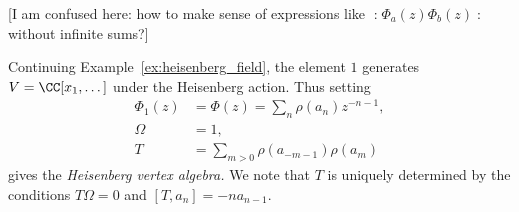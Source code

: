 \documentclass{ck-article}
\newcommand{\normord}[1]{\mathopen{:}#1\mathclose{:}}
\begin{document}
[I am confused here: how to make sense of expressions like $\normord{\Phi_a(z)\Phi_b(z)}$ without infinite sums?]

\begin{Example}
    Continuing Example~\ref{ex:heisenberg_field}, the element $1$ generates $V = \CC[x_1,\dots]$ under the Heisenberg action.
    Thus setting 
    \begin{align*}
        \Phi_1(z) & = \Phi(z) = \sum_n \rho(a_n) z^{-n-1}, \\
        \Omega &= 1, \\
        T &= \sum_{m > 0} \rho(a_{-m-1})\rho(a_m)
    \end{align*}
    gives the \emph{Heisenberg vertex algebra.}
    We note that $T$ is uniquely determined by the conditions $T\Omega = 0$ and $[T, a_n] = -na_{n-1}$.
\end{Example}

\printbibliography
\end{document}
